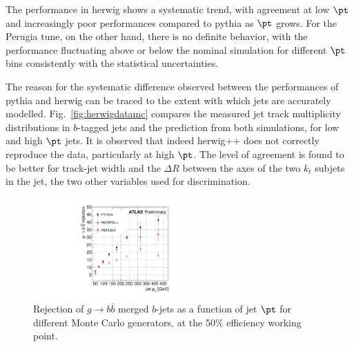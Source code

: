 
The performance in {\sc herwig} shows a systematic trend, with agreement at low $\pt$ and increasingly poor performances compared to {\sc pythia} as $\pt$ grows. For the Perugia tune, on the other hand, there is no definite behavior, with the performance fluctuating above or below the nominal simulation for different $\pt$ bins consistently with the statistical uncertainties.

The reason for the systematic difference observed between the performances of {\sc pythia} and {\sc herwig} can be traced to the extent with which jets are accurately modelled. Fig.~\ref{fig:herwigdatamc} compares the measured jet track multiplicity distributions in $b$-tagged jets and the prediction from both simulations, for low and high $\pt$ jets. It is observed that indeed {\sc herwig++} does not correctly reproduce the data, particularly at high $\pt$. The level of agreement is found to be better for track-jet width and the $\Delta R$ between the axes of the two $k_t$ subjets in the jet, the two other variables used for discrimination.






\begin{figure}[tp]
\centering
\includegraphics[width=0.49\textwidth]{gbbRejection_vs_PT_3MonteCarlos_50Eff.pdf}
\caption{Rejection of $g\rightarrow b \bar{b}$ merged $b$-jets as a function of jet $\pt$ for different Monte Carlo generators, at the 50\% efficiency working point.}
\label{fig:performanceotherMC}
\end{figure}

